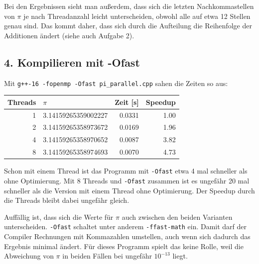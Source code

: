 \documentclass[11pt]{article}
\begin{document}
Bei den Ergebnissen sieht man außerdem, dass sich die letzten Nachkommastellen von $\pi$ je nach
Threadanzahl leicht unterscheiden, obwohl alle auf etwa 12 Stellen genau sind. Das kommt daher,
dass sich durch die Aufteilung die Reihenfolge der Additionen ändert (siehe auch Aufgabe 2).

\subsection*{4. Kompilieren mit -Ofast}

Mit \texttt{g++-16 -fopenmp -Ofast pi\_parallel.cpp} sahen die Zeiten so aus:

\begin{center}
\begin{tabular}{rlrr}
Threads & $\pi$ & Zeit [s] & Speedup \\
\hline
1 & 3.14159265359002227 & 0.0331 & 1.00 \\
2 & 3.14159265358973672 & 0.0169 & 1.96 \\
4 & 3.14159265358970652 & 0.0087 & 3.82 \\
8 & 3.14159265358974693 & 0.0070 & 4.73 \\
\end{tabular}
\end{center}

Schon mit einem Thread ist das Programm mit \texttt{-Ofast} etwa 4 mal schneller als ohne
Optimierung. Mit 8 Threads und \texttt{-Ofast} zusammen ist es ungefähr 20 mal schneller als die
Version mit einem Thread ohne Optimierung. Der Speedup durch die Threads bleibt dabei ungefähr
gleich.

Auffällig ist, dass sich die Werte für $\pi$ auch zwischen den beiden Varianten unterscheiden.
\texttt{-Ofast} schaltet unter anderem \texttt{-ffast-math} ein. Damit darf der Compiler
Rechnungen mit Kommazahlen umstellen, auch wenn sich dadurch das Ergebnis minimal ändert. Für
dieses Programm spielt das keine Rolle, weil die Abweichung von $\pi$ in beiden Fällen bei
ungefähr $10^{-13}$ liegt.
\end{document}
